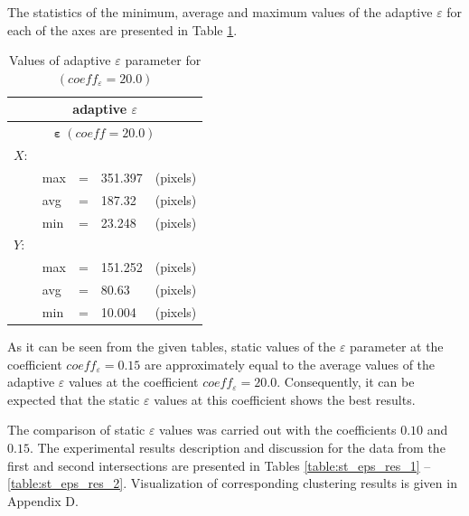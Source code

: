 The statistics of the minimum, average and maximum values of the adaptive $\varepsilon$ for each of the axes are presented in Table \ref{table:eps_adapt}.

\begin{table}[!htb]
	\caption{Values of adaptive $\varepsilon$ parameter for $(coeff_\varepsilon = 20.0)$}
	\label{table:eps_adapt}
	
	\setlength{\tabcolsep}{10pt}
	\centering
	
	\begin{tabular}{||lllll||}
		\multicolumn{5}{c}{adaptive $\varepsilon$} \\
		\hline
		\multicolumn{5}{||c||}{$\bm{\varepsilon}\ (coeff = 20.0)$}\\
		$X:$       			& & & & \\[0.5ex]
		& max 	& = 	& 351.397 	& (pixels) \\[0.5ex]
		& avg 	& = 	& 187.32 	& (pixels) \\[0.5ex]
		& min 	& = 	& 23.248 	& (pixels) \\[0.5ex]
		$Y:$       			& & & & \\[0.5ex]
		& max 	& = 	& 151.252 	& (pixels) \\[0.5ex]
		& avg 	& = 	& 80.63 	& (pixels) \\[0.5ex]
		& min 	& = 	& 10.004 	& (pixels) \\[0.5ex]
		\hline
	\end{tabular}
\end{table}

As it can be seen from the given tables, static values of the $\varepsilon$ parameter at the coefficient $coeff_\varepsilon = 0.15$ are approximately equal to the average values of the adaptive $\varepsilon$ values at the coefficient $coeff_\varepsilon = 20.0$. Consequently, it can be expected that the static $\varepsilon$ values at this coefficient shows the best results.

The comparison of static $\varepsilon$ values was carried out with the coefficients $0.10$ and $0.15$. The experimental results description and discussion for the data from the first and second intersections are presented in Tables \ref{table:st_eps_res_1} -- \ref{table:st_eps_res_2}. Visualization of corresponding clustering results is given in Appendix D.

